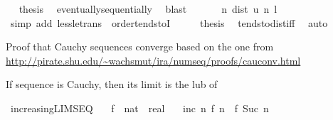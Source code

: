 \begin{isabellebody}
\ \isamarkupfalse%
\ {\isacharquery}{\kern0pt}thesis\ \isamarkupfalse%
\ eventually{\isacharunderscore}{\kern0pt}sequentially\ \isamarkupfalse%
\ blast\isanewline
\ \ \isamarkupfalse%
\isanewline
\ \ \isamarkupfalse%
\ {\isachardoublequoteopen}{\isacharparenleft}{\kern0pt}{\isasymlambda}n{\isachardot}{\kern0pt}\ dist\ {\isacharparenleft}{\kern0pt}u\ n{\isacharparenright}{\kern0pt}\ l{\isacharparenright}{\kern0pt}\ {\isasymlonglonglongrightarrow}\ {}{\isachardoublequoteclose}\isanewline
\ \ \ \ \isamarkupfalse%
\ {\isacharparenleft}{\kern0pt}simp\ add{\isacharcolon}{\kern0pt}\ less{\isacharunderscore}{\kern0pt}le{\isacharunderscore}{\kern0pt}trans\ {\isacharasterisk}{\kern0pt}\ order{\isacharunderscore}{\kern0pt}tendstoI{\isacharparenright}{\kern0pt}\isanewline
\ \ \isamarkupfalse%
\ \isamarkupfalse%
\ {\isacharquery}{\kern0pt}thesis\ \isamarkupfalse%
\ tendsto{\isacharunderscore}{\kern0pt}dist{\isacharunderscore}{\kern0pt}iff\ \isamarkupfalse%
\ auto\isanewline
{}\isamarkupfalse%
%
\endisatagproof
{\isafoldproof}%
%
\isadelimproof
%
\endisadelimproof
%
\isadelimdocument
%
\endisadelimdocument
%
\isatagdocument
%
\isamarkuptrue%
%
\endisatagdocument
{\isafolddocument}%
%
\isadelimdocument
%
\endisadelimdocument
%
\begin{isamarkuptext}%
Proof that Cauchy sequences converge based on the one from
  \url{http://pirate.shu.edu/~wachsmut/ira/numseq/proofs/cauconv.html}%
\end{isamarkuptext}\isamarkuptrue%
%
\begin{isamarkuptext}%
If sequence  is Cauchy, then its limit is the lub of
\end{isamarkuptext}\isamarkuptrue%
\isamarkupfalse%
\ increasing{\isacharunderscore}{\kern0pt}LIMSEQ{\isacharcolon}{\kern0pt}\isanewline
\ \ \ f\ {\isacharcolon}{\kern0pt}{\isacharcolon}{\kern0pt}\ {\isachardoublequoteopen}nat\ {\isasymRightarrow}\ real{\isachardoublequoteclose}\isanewline
\ \ \ inc{\isacharcolon}{\kern0pt}\ {\isachardoublequoteopen}{\isasymAnd}n{\isachardot}{\kern0pt}\ f\ n\ {\isasymle}\ f\ {\isacharparenleft}{\kern0pt}Suc\ n{\isacharparenright}{\kern0pt}{\isachardoublequoteclose}\isanewline

\end{isabellebody}

